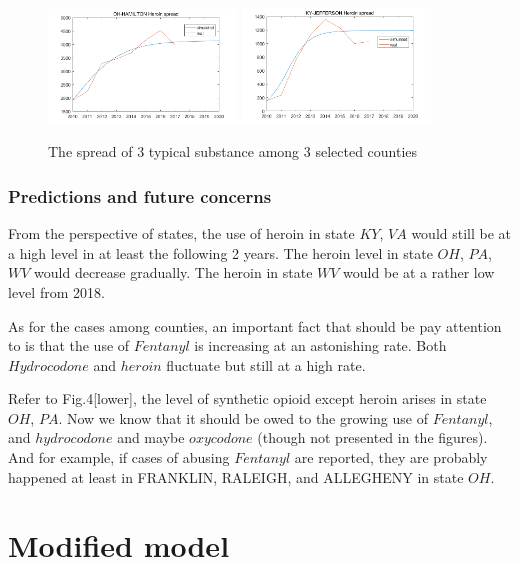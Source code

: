 \documentclass[12pt]{article}
\begin{document}
\begin{figure}[!htbp]
\includegraphics[width=5cm]{Fig/h2}
\includegraphics[width=5cm]{Fig/h3}
\caption{The spread of 3 typical substance among 3 selected counties}
\end{figure}


\subsubsection{Predictions and future concerns}
From the perspective of states, the use of heroin in state $KY$, $VA$ would still be at a high level in at least the following 2 years. The heroin level in state $OH$, $PA$, $WV$ would decrease gradually. The heroin in state $WV$ would be at a rather low level from 2018.

As for the cases among counties, an important fact that should be pay attention to is that the use of $Fentanyl$ is increasing at an astonishing rate. Both $Hydrocodone$ and $heroin$ fluctuate but still at a high rate. 

Refer to Fig.4[lower], the level of synthetic opioid except heroin arises in state $OH$, $PA$. Now we know that it should be owed to the growing use of $Fentanyl$, and 
$hydrocodone$ and maybe $oxycodone$ (though not presented in the figures). And for example, if cases of abusing $Fentanyl$ are reported, they are probably happened at least in FRANKLIN, RALEIGH, and ALLEGHENY in state $OH$.

\section{Modified model}
\end{document}
